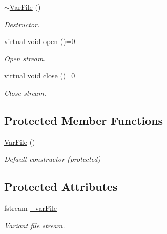\begin{DoxyCompactItemize}
\mbox{\label{classsamp_files_1_1_var_file_a6fc68235909673e44569d1c02a13d04e}} 
\hyperlink{classsamp_files_1_1_var_file_a6fc68235909673e44569d1c02a13d04e}{$\sim$\+Var\+File} ()
\begin{DoxyCompactList}\small\item\em Destructor. \end{DoxyCompactList}\item 
\mbox{\label{classsamp_files_1_1_var_file_a11467bf7eba70225e5e5d23529ba941f}} 
virtual void \hyperlink{classsamp_files_1_1_var_file_a11467bf7eba70225e5e5d23529ba941f}{open} ()=0
\begin{DoxyCompactList}\small\item\em Open stream. \end{DoxyCompactList}\item 
\mbox{\label{classsamp_files_1_1_var_file_a6fa9c8825d35c8eb09bd8bea067f050d}} 
virtual void \hyperlink{classsamp_files_1_1_var_file_a6fa9c8825d35c8eb09bd8bea067f050d}{close} ()=0
\begin{DoxyCompactList}\small\item\em Close stream. \end{DoxyCompactList}\end{DoxyCompactItemize}
\subsection*{Protected Member Functions}
\begin{DoxyCompactItemize}
\item 
\mbox{\label{classsamp_files_1_1_var_file_a2e984df91130ea7d16cb88d2cf1db735}} 
\hyperlink{classsamp_files_1_1_var_file_a2e984df91130ea7d16cb88d2cf1db735}{Var\+File} ()
\begin{DoxyCompactList}\small\item\em Default constructor (protected) \end{DoxyCompactList}\end{DoxyCompactItemize}
\subsection*{Protected Attributes}
\begin{DoxyCompactItemize}
\item 
\mbox{\label{classsamp_files_1_1_var_file_a7a038c022ba8a1558b13797ddd9ff323}} 
fstream \hyperlink{classsamp_files_1_1_var_file_a7a038c022ba8a1558b13797ddd9ff323}{\+\_\+var\+File}
\begin{DoxyCompactList}\small\item\em Variant file stream. \end{DoxyCompactList}\end{DoxyCompactItemize}


